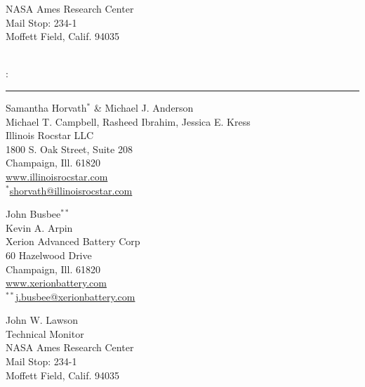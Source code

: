 \begin{titlepage}
	\begin{center}
		{\small NASA Ames Research Center} \\
		{\small Mail Stop: 234-1} \\
		{\small Moffett Field, Calif. 94035}
	\end{center}
        \thispagestyle{empty}
         		
\end{titlepage}
	\newpage
	\irheader{\connum}{}
	\setcounter{page}{2}
	\noindent 
	
	\begin{flushleft}
		{\large {\bf \rptname}} \\
		{\connum: \conname}
		\hrule
	\end{flushleft}
	
	\vspace*{5mm}
	
	\begin{center}
		Samantha Horvath$^*$ \& Michael J. Anderson \\ Michael T. Campbell, Rasheed Ibrahim, Jessica E. Kress \\
		Illinois Rocstar LLC    \\
		1800 S. Oak Street, Suite 208  \\
		Champaign, Ill. 61820     \\
		\url{www.illinoisrocstar.com}\\
		$^*$\url{shorvath@illinoisrocstar.com} \\
	\end{center}
	
	\vspace{0.5mm}
	
	\begin{center}
		John Busbee$^{**}$ \\
		Kevin A. Arpin \\
		Xerion Advanced Battery Corp \\
		60 Hazelwood Drive \\
		Champaign, Ill. 61820 \\
		\url{www.xerionbattery.com}\\
		$^{**}$\url{j.busbee@xerionbattery.com} \\		
	\end{center}
	
	\vspace{0.5mm}
	
	\begin{center}
               John W. Lawson \\
               Technical Monitor \\
               NASA Ames Research Center \\
               Mail Stop: 234-1 \\
               Moffett Field, Calif. 94035
	\end{center}
	
